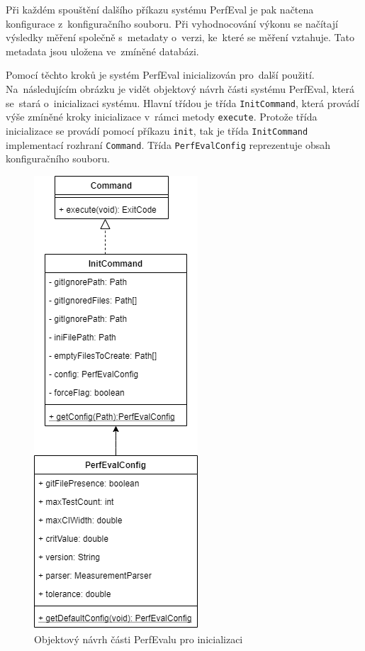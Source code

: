 Při každém spouštění dalšího příkazu systému PerfEval je pak načtena konfigurace z~konfiguračního souboru.
Při vyhodnocování výkonu se načítají výsledky měření společně s~metadaty o~verzi, ke~které se měření vztahuje.
Tato metadata jsou uložena ve~zmíněné databázi.

Pomocí těchto kroků je systém PerfEval inicializován pro~další použití.
Na~následujícím obrázku je vidět objektový návrh části systému PerfEval, která se~stará o~inicializaci systému.
Hlavní třídou je třída \lstinline|InitCommand|, která provádí výše zmíněné kroky inicializace v~rámci metody \lstinline|execute|.
Protože třída inicializace se provádí pomocí příkazu \texttt{init}, tak je třída \lstinline|InitCommand| implementací rozhraní \lstinline|Command|.
Třída \lstinline|PerfEvalConfig| reprezentuje obsah konfiguračního souboru.

\begin{figure}[!ht]
    \centering
    \includegraphics[height=0.5\textheight]{../img/perfeval_init.png}
    \caption{Objektový návrh části PerfEvalu pro inicializaci}
\end{figure}

